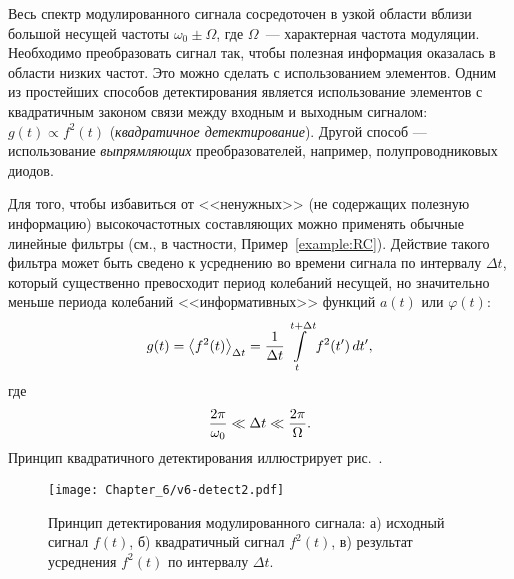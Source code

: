 Весь спектр модулированного сигнала сосредоточен в узкой области
вблизи большой несущей частоты $\omega_0\pm \Omega$, где $\Omega$~---
характерная частота модуляции. Необходимо преобразовать сигнал так,
чтобы полезная информация оказалась в области низких частот. Это можно
сделать с использованием  элементов. 
Одним из простейших способов детектирования является использование 
элементов с квадратичным законом связи 
между входным и выходным сигналом:
$g(t)\propto f^2(t)$ (\emph{квадратичное детектирование}).
Другой способ --- использование \emph{выпрямляющих}
преобразователей, например, полупроводниковых диодов.

Для того, чтобы избавиться от <<ненужных>> (не содержащих полезную
информацию) высокочастотных составляющих можно применять обычные линейные
фильтры (см., в частности, Пример~\ref{example:RC}). Действие такого фильтра может быть сведено к усреднению во времени
сигнала по интервалу $\Delta t$, который существенно превосходит период
колебаний несущей, но значительно меньше периода колебаний <<информативных>>
функций $a(t)$ или $\varphi(t)$:
\begin{equation}
    \eqmark{averages-sq}
g(t) = \left<f^2(t)\right>_{\Delta t} = \frac{1}{\Delta t}
\int\limits_{t}^{t+\Delta t} f^2(t')\,dt',
\end{equation}
где
\begin{equation}
    \eqmark{averages-cond}
    \frac{2\pi}{\omega_0} \ll \Delta t \ll \frac{2\pi}{\Omega}.
\end{equation}
Принцип квадратичного детектирования иллюстрирует рис.~.
\begin{figure}[h]
 \texttt{[image: Chapter\_6/v6-detect2.pdf]}
 \caption{Принцип детектирования модулированного сигнала:
     а) исходный сигнал $f(t)$, б) квадратичный сигнал
 $f^2(t)$, в) результат усреднения $f^2(t)$ по интервалу $\Delta t$.
}
\end{figure}

